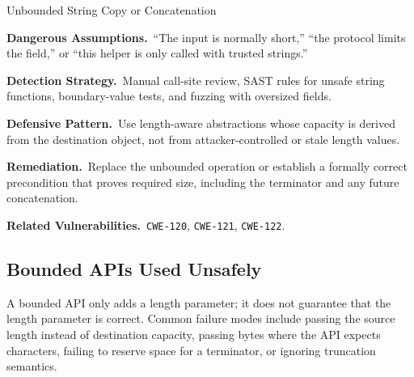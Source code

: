 \documentclass[11pt]{article}
\newcommand{\field}[1]{\par\smallskip\noindent\textbf{#1.}\ }
\newcommand{\cwe}[1]{\texttt{#1}}
\begin{document}
\begin{catalogbox}{Unbounded String Copy or Concatenation}
\field{Dangerous Assumptions}``The input is normally short,'' ``the protocol limits the field,'' or ``this helper is only called with trusted strings.''

\field{Detection Strategy}Manual call-site review, SAST rules for unsafe string functions, boundary-value tests, and fuzzing with oversized fields.

\field{Defensive Pattern}Use length-aware abstractions whose capacity is derived from the destination object, not from attacker-controlled or stale length values.

\field{Remediation}Replace the unbounded operation or establish a formally correct precondition that proves required size, including the terminator and any future concatenation.

\field{Related Vulnerabilities}\cwe{CWE-120}, \cwe{CWE-121}, \cwe{CWE-122}.
\end{catalogbox}
\clearpage

\subsection{Bounded APIs Used Unsafely}

A bounded API only adds a length parameter; it does not guarantee that the length parameter is correct. Common failure modes include passing the source length instead of destination capacity, passing bytes where the API expects characters, failing to reserve space for a terminator, or ignoring truncation semantics.
\end{document}
